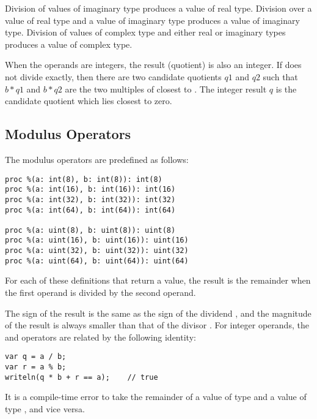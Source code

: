 Division of values of imaginary type produces a value of real type.
Division over a value of real type and a value of imaginary type
produces a value of imaginary type.  Division of values of complex
type and either real or imaginary types produces a value of complex
type.

When the operands are integers, the result (quotient) is also an integer.  If 
does not divide  exactly, then there are two candidate quotients $q1$ and $q2$
such that $b * q1$ and $b * q2$ are the two multiples of  closest to .
The integer result $q$ is the candidate quotient which lies closest to zero.

\pagebreak
\subsection{Modulus Operators}
\label{Modulus_Operators}

The modulus operators are predefined as follows:
\begin{chapel}
\begin{verbatim}
proc %(a: int(8), b: int(8)): int(8)
proc %(a: int(16), b: int(16)): int(16)
proc %(a: int(32), b: int(32)): int(32)
proc %(a: int(64), b: int(64)): int(64)

proc %(a: uint(8), b: uint(8)): uint(8)
proc %(a: uint(16), b: uint(16)): uint(16)
proc %(a: uint(32), b: uint(32)): uint(32)
proc %(a: uint(64), b: uint(64)): uint(64)
\end{verbatim}
\end{chapel}
For each of these definitions that return a value, the result is the
remainder when the first operand is divided by the second operand.

The sign of the result is the same as the sign of the dividend , and the
magnitude of the result is always smaller than that of the divisor .
For integer operands, the \chpl{\%} and \chpl{/} operators are related by the
following identity:
\begin{chapel}
\begin{verbatim}
var q = a / b;
var r = a % b;
writeln(q * b + r == a);    // true
\end{verbatim}
\end{chapel}

It is a compile-time error to take the remainder of a value of
type  and a value of type , and vice
versa.

